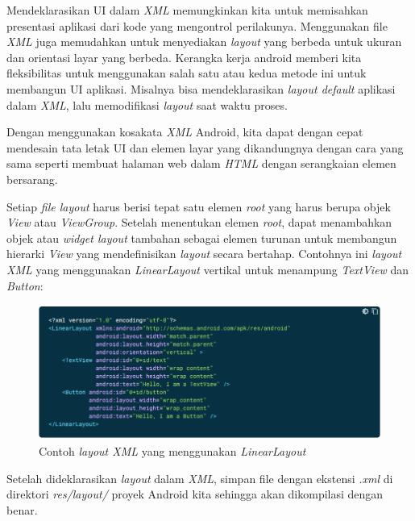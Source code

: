Mendeklarasikan UI dalam \textit{XML} memungkinkan kita untuk memisahkan presentasi aplikasi dari kode yang mengontrol perilakunya. Menggunakan file \textit{XML} juga memudahkan untuk menyediakan \textit{layout} yang berbeda untuk ukuran dan orientasi layar yang berbeda.
Kerangka kerja android memberi kita fleksibilitas untuk menggunakan salah satu atau kedua metode ini untuk membangun UI aplikasi. Misalnya bisa mendeklarasikan \textit{layout default} aplikasi dalam \textit{XML}, lalu memodifikasi \textit{layout} saat waktu proses.

Dengan menggunakan kosakata \textit{XML} Android, kita dapat dengan cepat mendesain tata letak UI dan elemen layar yang dikandungnya dengan cara yang sama seperti membuat halaman web dalam \textit{HTML} dengan serangkaian elemen bersarang.

Setiap \textit{file layout} harus berisi tepat satu elemen \textit{root} yang harus berupa objek \textit{View} atau \textit{ViewGroup}. Setelah menentukan elemen \textit{root}, dapat menambahkan objek atau \textit{widget layout} tambahan sebagai elemen turunan untuk membangun hierarki \textit{View} yang mendefinisikan \textit{layout} secara bertahap. Contohnya ini \textit{layout XML} yang menggunakan \textit{LinearLayout} vertikal untuk menampung \textit{TextView} dan \textit{Button}:
\begin{figure}[H]
	\centering
	\includegraphics[keepaspectratio, width=12cm]{gambar/layout_linearlayout}
	\caption{Contoh \textit{layout XML} yang menggunakan \textit{LinearLayout} \citep{developerandroid}}
	\label{gambar:gambar_43}
\end{figure}

Setelah dideklarasikan \textit{layout} dalam \textit{XML}, simpan file dengan ekstensi \textit{.xml} di direktori \textit{res/layout/} proyek Android kita sehingga akan dikompilasi dengan benar.

